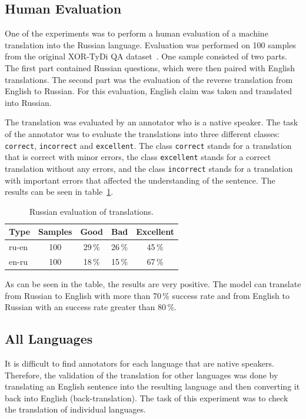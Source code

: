 \subsection*{Human Evaluation}
One of the experiments was to perform a human evaluation of a machine translation into the Russian language. Evaluation was performed on 100 samples from the original XOR-TyDi QA dataset~\cite{xortydiqa}. One sample consisted of two parts. The first part contained Russian questions, which were then paired with English translations. The second part was the evaluation of the reverse translation from English to Russian. For this evaluation, English claim was taken and translated into Russian.

The translation was evaluated by an annotator who is a native speaker. The task of the annotator was to evaluate the translations into three different classes: \texttt{correct}, \texttt{incorrect} and \texttt{excellent}. The class \texttt{correct} stands for a translation that is correct with minor errors, the class \texttt{excellent} stands for a correct translation without any errors, and the class \texttt{incorrect} stands for a translation with important errors that affected the understanding of the sentence. The results can be seen in table~\ref{tab:ru_translation}.

\begin{table}[H]
    \centering
    \begin{tabular}{l|cccc}
        \hline
        Type & Samples & Good & Bad & Excellent \\
        \hline
        ru-en & 100 & 29\,\% & 26\,\% & 45\,\% \\
        en-ru & 100 & 18\,\% & 15\,\% & 67\,\% \\
        \hline
    \end{tabular}
    \caption{Russian evaluation of translations.}
    \label{tab:ru_translation}
\end{table}

As can be seen in the table, the results are very positive. The model can translate from Russian to English with more than 70\,\% success rate and from English to Russian with an success rate greater than 80\,\%. %

\subsection*{All Languages}\label{seq:languages_translation}
It is difficult to find annotators for each language that are native speakers. Therefore, the validation of the translation for other languages was done by translating an English sentence into the resulting language and then converting it back into English (back-translation). The task of this experiment was to check the translation of individual languages.

